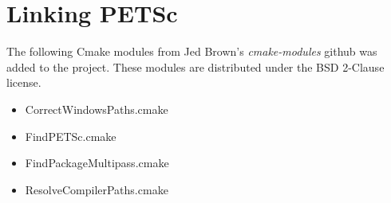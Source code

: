 \chapter{Linking PETSc}

The following Cmake modules from Jed Brown's \emph{cmake-modules}\cite{jedBrownPetscCmake} 
github was added to the project. These modules are distributed under the BSD 2-Clause
license. 

\begin{itemize}
	\item CorrectWindowsPaths.cmake
	\item FindPETSc.cmake
	\item FindPackageMultipass.cmake
	\item ResolveCompilerPaths.cmake
\end{itemize}